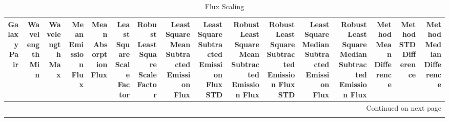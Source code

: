 \begin{longtable}{rrrrrrrrrrrrrrrr}
\caption{Flux Scaling}\\
\toprule
 Galaxy Pair &  Wavelength Min &  Wavelength Max &  Mean Emission Flux &  Mean Absorption Flux &  Least Square Scale Factor &  Robust Least Square Scale Factor &  Least Square Mean Subtracted Emission Flux &  Least Square Subtracted Emission Flux STD &  Robust Least Square Mean Subtracted Emission Flux &  Robust Least Square Subtracted Emission Flux STD &  Least Square Median Subtracted Emission Flux &  Robust Least Square Median Subtracted Emission Flux &  Method Mean Difference &  Method STD Difference &  Method Median Difference \\
\midrule
\endhead
\midrule
\multicolumn{16}{r}{{Continued on next page}} \\
\midrule
\endfoot


\end{longtable}
